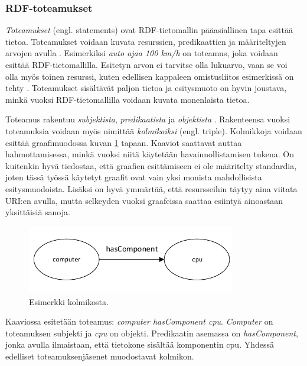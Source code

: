 \documentclass[finnish, 12pt, a4paper, elec, utf8, pdfa, online]{aaltothesis}
\begin{document}
\subsubsection{RDF-toteamukset}
\textit{Toteamukset} (engl. statements) ovat RDF-tietomallin pääasiallinen tapa esittää tietoa. Toteamukset voidaan kuvata resurssien, predikaattien ja määriteltyjen arvojen avulla \cite{Antoniou}. Esimerkiksi \textit{auto ajaa 100 km/h} on toteamus, joka voidaan esittää RDF-tietomallilla. Esitetyn arvon ei tarvitse olla lukuarvo, vaan se voi olla myös toinen resurssi, kuten edellisen kappaleen omistusliitos esimerkissä on tehty \cite{Antoniou}\cite{IEEE_XML}. Toteamukset sisältävät paljon tietoa ja esitysmuoto on hyvin joustava, minkä vuoksi RDF-tietomallilla voidaan kuvata monenlaista tietoa.

Toteamus rakentuu \textit{subjektista}, \textit{predikaatista} ja \textit{objektista} \cite{lassila_dissertion}. Rakenteensa vuoksi toteamuksia voidaan myös nimittää \textit{kolmikoiksi} (engl. triple). Kolmikkoja voidaan esittää graafimuodossa kuvan \ref{images/RDF-triplet1} tapaan. Kaaviot saattavat auttaa hahmottamisessa, minkä vuoksi niitä käytetään havainnollistamisen tukena. On kuitenkin hyvä tiedostaa, että graafien esittämiseen ei ole määritelty standardia, joten tässä työssä käytetyt graafit ovat vain yksi monista mahdollisista esitysmuodoista. Lisäksi on hyvä ymmärtää, että resursseihin täytyy aina viitata URI:en avulla, mutta selkeyden vuoksi graafeissa saattaa esiintyä ainoastaan yksittäisiä sanoja.

\begin{figure}[htb]
\centering
\includegraphics[height=3cm]{images/RDF-triplet.pdf}
\caption{Esimerkki kolmikosta. \label{images/RDF-triplet1}}
\end{figure}

Kaaviossa esitetään toteamus: \textit{computer hasComponent cpu}. \textit{Computer} on toteamuksen subjekti ja \textit{cpu} on objekti. Predikaatin asemassa on \textit{hasComponent}, jonka avulla ilmaistaan, että tietokone sisältää komponentin cpu. Yhdessä edelliset toteamuksenjäsenet muodostavat kolmikon.
\end{document}
